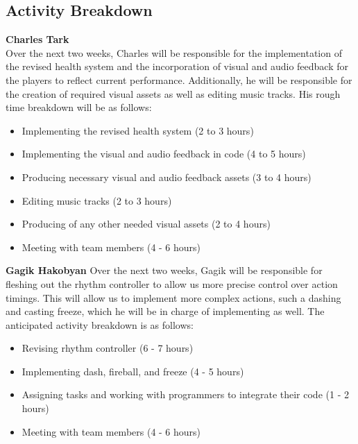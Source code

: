 \documentclass[]{article}
\begin{document}
\subsection*{Activity Breakdown}

\noindent
\textbf{Charles Tark}\\
Over the next two weeks, Charles will be responsible for the
implementation of the revised health system and the incorporation of
visual and audio feedback for the players to reflect current
performance. Additionally, he will be responsible for the creation of
required visual assets as well as editing music tracks.
His rough time breakdown will be as follows:
\begin{itemize}
  \item Implementing the revised health system (2 to 3 hours)
  \item Implementing the visual and audio feedback in code (4 to 5 hours)
  \item Producing necessary visual and audio feedback assets (3 to 4 hours)
  \item Editing music tracks (2 to 3 hours)
  \item Producing of any other needed visual assets (2 to 4 hours)
  \item Meeting with team members (4 - 6 hours)
\end{itemize}

\noindent
\textbf{Gagik Hakobyan}
Over the next two weeks, Gagik will be responsible for fleshing out
the rhythm controller to allow us more precise control over action
timings. This will allow us to implement more complex actions, such a
dashing and casting freeze, which he will be in charge of implementing
as well. The anticipated activity breakdown is as follows:
\begin{itemize}
\item Revising rhythm controller (6 - 7 hours)
\item Implementing dash, fireball, and freeze (4 - 5 hours)
\item Assigning tasks and working with programmers to integrate their 
  code (1 - 2 hours)
\item Meeting with team members (4 - 6 hours)
\end{itemize}
\end{document}
